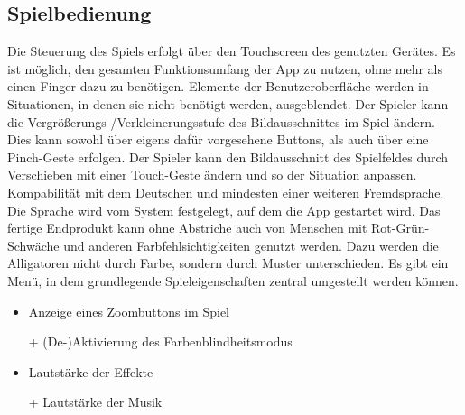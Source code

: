 \subsection {Spielbedienung}
\begin {requirements}
	 Die Steuerung des Spiels erfolgt über den Touchscreen des genutzten Gerätes.
	 Es ist möglich, den gesamten Funktionsumfang der App zu nutzen, ohne mehr als einen Finger dazu zu benötigen.
	 Elemente der Benutzeroberfläche werden in Situationen, in denen sie nicht benötigt werden, ausgeblendet.
	 Der Spieler kann die Vergrößerungs-/Verkleinerungsstufe des Bildausschnittes im Spiel ändern.
	Dies kann sowohl über eigens dafür vorgesehene Buttons, als auch über eine Pinch-Geste erfolgen.
	Der Spieler kann den Bildausschnitt des Spielfeldes durch Verschieben mit einer Touch-Geste ändern und so der Situation anpassen.
	Kompabilität mit dem Deutschen und mindesten einer weiteren Fremdsprache.
	Die Sprache wird vom System festgelegt, auf dem die App gestartet wird.
	Das fertige Endprodukt kann ohne Abstriche auch von Menschen mit Rot-Grün-Schwäche und anderen Farbfehlsichtigkeiten genutzt werden.
	Dazu werden die Alligatoren nicht durch Farbe, sondern durch Muster unterschieden.
	 Es gibt ein Menü, in dem grundlegende Spieleigenschaften zentral umgestellt werden können.
		\begin{itemize}
			\item Anzeige eines Zoombuttons im Spiel
			\item[+] (De-)Aktivierung des Farbenblindheitsmodus
			\item Lautstärke der Effekte
			\item[+] Lautstärke der Musik
		\end{itemize}
\end {requirements}

